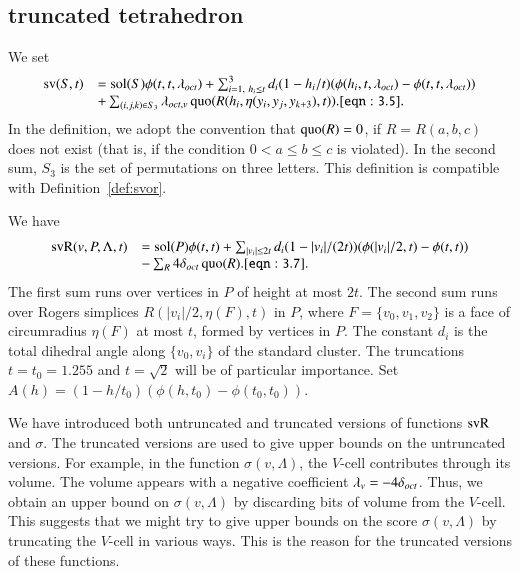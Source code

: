 \subsection{truncated tetrahedron}


We set
    \begin{equation}
    \begin{array}{lll}
    \op{sv}(S,t) &=
    \sol(S)\phi(t,t,\lambda_{oct})
    +\sum_{i=1,\ h_i\le t}^3 d_i (1-h_i/t) (\phi(h_i,t,\lambda_{oct})-
    \phi(t,t,\lambda_{oct})) \\
    &+\sum_{(i,j,k)\in S_3}
    \lambda_{oct,v}
    \quo(R(h_i,\eta(y_i,y_j,y_{k+3}),t)).
    \tlabel{eqn:3.5}
    \end{array}
    \end{equation}
In the definition, we adopt the convention that $\operatorname{quo}(R)=0$, if
$R=R(a,b,c)$ does not exist (that is, if the condition
    $0< a\le b\le c$
is violated). In the second sum, $S_3$ is the set of permutations
on three letters. This definition is compatible with
Definition~\ref{def:svor}.

We have
    \begin{equation}
    \begin{array}{lll}
    \op{svR}(v,P,\Lambda,t) &=
    \sol(P)\phi(t,t)
    +\sum_{|v_i|\le 2t} d_i (1-|v_i|/(2t)) (\phi(|v_i|/2,t)-
    \phi(t,t)) \\
    &-\sum_{R} 4\doct \quo(R).
    \tlabel{eqn:3.7}
    \end{array}
    \end{equation}
The first sum runs over vertices in $P$ of height at most $2t$.
The second sum runs over Rogers simplices $R(|v_i|/2,\eta(F),t)$
in $P$, where $F=\{v_0,v_1,v_2\}$ is a face of circumradius
$\eta(F)$ at most $t$, formed by vertices in $P$.  The constant
$d_i$ is the total dihedral angle along $\{v_0,v_i\}$ of the
standard cluster. The truncations $t=t_0=1.255$ and $t=\sqrt2$
will be of particular importance.
    Set $A(h) = (1-h/t_0) (\phi(h,t_0)-\phi(t_0,t_0))$.

\begin{remark}  We have introduced both untruncated and truncated
versions of functions ${\operatorname{svR}}$ and $\sigma$.  The truncated versions
are used to give upper bounds on the untruncated versions.  For
example,  in the function $\sigma(v,\Lambda)$, the $V$-cell contributes
through its volume.  The volume
appears with a negative coefficient 
$\lambda_v=-4\delta_{oct}$.  Thus, we obtain an
upper bound on $\sigma(v,\Lambda)$ by discarding bits of volume from the
$V$-cell.   This suggests that we might try to give upper bounds
on the score $\sigma(v,\Lambda)$ by truncating the $V$-cell in various
ways. This is the reason for the truncated versions of these
functions.
\end{remark}




